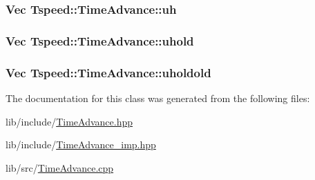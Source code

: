 \hypertarget{classTspeed_1_1TimeAdvance_ab453aee6ca36887379834a7a228989d0}{
\subsubsection[{uh}]{\setlength{\rightskip}{0pt plus 5cm}Vec Tspeed\-::\-Time\-Advance\-::uh\hspace{0.3cm}{\ttfamily [protected]}}}\label{classTspeed_1_1TimeAdvance_ab453aee6ca36887379834a7a228989d0}
\hypertarget{classTspeed_1_1TimeAdvance_a5b8df69f25e0c457f1e6d1c7c6ed77e2}{
\subsubsection[{uhold}]{\setlength{\rightskip}{0pt plus 5cm}Vec Tspeed\-::\-Time\-Advance\-::uhold\hspace{0.3cm}{\ttfamily [protected]}}}\label{classTspeed_1_1TimeAdvance_a5b8df69f25e0c457f1e6d1c7c6ed77e2}
\hypertarget{classTspeed_1_1TimeAdvance_a226deb2e9c8d165ad896bceb92c1330c}{
\subsubsection[{uholdold}]{\setlength{\rightskip}{0pt plus 5cm}Vec Tspeed\-::\-Time\-Advance\-::uholdold\hspace{0.3cm}{\ttfamily [protected]}}}\label{classTspeed_1_1TimeAdvance_a226deb2e9c8d165ad896bceb92c1330c}


The documentation for this class was generated from the following files\-:\begin{DoxyCompactItemize}
\item 
lib/include/\hyperlink{TimeAdvance_8hpp}{Time\-Advance.\-hpp}\item 
lib/include/\hyperlink{TimeAdvance__imp_8hpp}{Time\-Advance\-\_\-imp.\-hpp}\item 
lib/src/\hyperlink{TimeAdvance_8cpp}{Time\-Advance.\-cpp}\end{DoxyCompactItemize}
